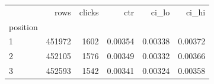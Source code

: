 \begin{tabular}{lrrrrr}
\toprule
 & rows & clicks & ctr & ci\_lo & ci\_hi \\
position &  &  &  &  &  \\
\midrule
1 & 451972 & 1602 & 0.00354 & 0.00338 & 0.00372 \\
2 & 452105 & 1576 & 0.00349 & 0.00332 & 0.00366 \\
3 & 452593 & 1542 & 0.00341 & 0.00324 & 0.00358 \\
\bottomrule
\end{tabular}
